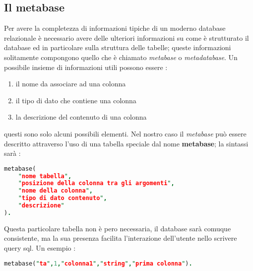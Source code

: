 \subsection{Il metabase}
Per avere la completezza di informazioni tipiche di un moderno database relazionale è necessario avere delle ulteriori informazioni su come è strutturato il database ed in particolare sulla struttura delle tabelle; queste informazioni solitamente compongono quello che è chiamato \emph{metabase} o \emph{metadatabase}. Un possibile insieme di informazioni utili possono essere : 
\begin{enumerate}
\item il nome da associare ad una colonna
\item il tipo di dato che contiene una colonna
\item la descrizione del contenuto di una colonna 
\end{enumerate}
questi sono solo alcuni possibili elementi. Nel nostro caso il \emph{metabase} può essere descritto attraverso l'uso di una tabella speciale dal nome {\bf metabase}; la sintassi sarà : 
\begin{lstlisting}[language=Prolog,showstringspaces=false]
metabase(
	"nome tabella",
	"posizione della colonna tra gli argomenti",
	"nome della colonna",
	"tipo di dato contenuto",
	"descrizione"
).
\end{lstlisting}
Questa particolare tabella non è pero necessaria, il database sarà comuque consistente, ma la sua presenza facilita l'interazione dell'utente nello scrivere query sql. Un esempio :
\begin{lstlisting}[language=Prolog,showstringspaces=false]
metabase("ta",1,"colonna1","string","prima colonna").
\end{lstlisting}